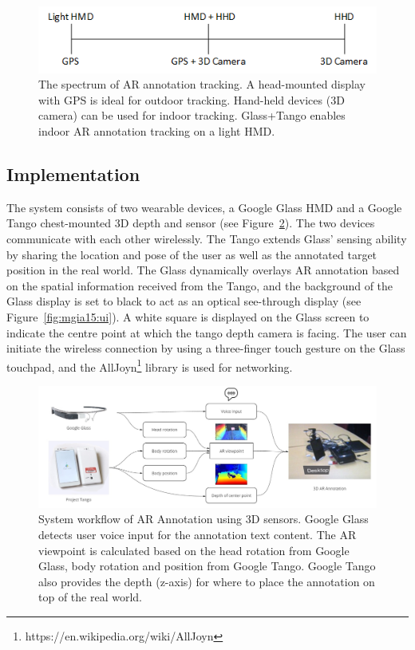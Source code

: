 \begin{figure}[ht]
  \centering
  \includegraphics[width=0.8\linewidth]{images/62-3d-mgia15/tango_paper_continuum.png}
  \caption{The spectrum of AR annotation tracking. A head-mounted display with GPS is ideal for outdoor tracking. Hand-held devices (3D camera) can be used for indoor tracking. Glass+Tango enables indoor AR annotation tracking on a light HMD.}
  \label{fig:mgia15:spectrum}
\end{figure}

\subsection{Implementation}

The system consists of two wearable devices, a Google Glass HMD and a Google Tango chest-mounted 3D depth and sensor (see Figure~\ref{fig:mgia15:framework}). The two devices communicate with each other wirelessly. The Tango extends Glass' sensing ability by sharing the location and pose of the user as well as the annotated target position in the real world. The Glass dynamically overlays AR annotation based on the spatial information received from the Tango, and the background of the Glass display is set to black to act as an optical see-through display (see Figure~\ref{fig:mgia15:ui}). A white square is displayed on the Glass screen to indicate the centre point at which the tango depth camera is facing. The user can initiate the wireless connection by using a three-finger touch gesture on the Glass touchpad, and the AllJoyn\footnote{https://en.wikipedia.org/wiki/AllJoyn} library is used for networking.

\begin{figure}[ht]
  \centering
  \includegraphics[width=\linewidth]{images/62-3d-mgia15/mgia2015-system.jpg}
  \caption{System workflow of AR Annotation using 3D sensors. Google Glass detects user voice input for the annotation text content. The AR viewpoint is calculated based on the head rotation from Google Glass, body rotation and position from Google Tango. Google Tango also provides the depth (z-axis) for where to place the annotation on top of the real world.}
  \label{fig:mgia15:framework}
\end{figure}

